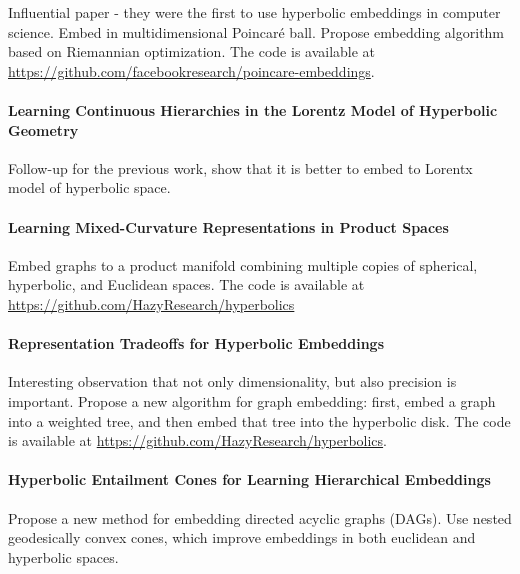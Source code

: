 \documentclass{article}
\begin{document}
Influential paper - they were the first to use hyperbolic embeddings in computer science.
Embed in multidimensional Poincar{\'e} ball. Propose embedding algorithm based on Riemannian optimization. The code is available at \url{https://github.com/facebookresearch/poincare-embeddings}.

\paragraph{Learning Continuous Hierarchies in the Lorentz Model of Hyperbolic Geometry~\cite{nickel2018learning}}

Follow-up for the previous work, show that it is better to embed to Lorentx model of hyperbolic space. 

\paragraph{Learning Mixed-Curvature Representations in Product Spaces~\cite{gu2019learning}}

Embed graphs to a product manifold combining multiple copies of spherical,
hyperbolic, and Euclidean spaces. The code is available at \url{https://github.com/HazyResearch/hyperbolics}

\paragraph{Representation Tradeoffs for Hyperbolic Embeddings~\cite{sala2018representation}}

Interesting observation that not only dimensionality, but also precision is important.
Propose a new algorithm for graph embedding: first, embed a graph into a weighted tree, and then embed that tree into the hyperbolic disk. The code is available at \url{https://github.com/HazyResearch/hyperbolics}.

\paragraph{Hyperbolic Entailment Cones for Learning Hierarchical Embeddings~\cite{ganea2018hyperbolic}}

Propose a new method for embedding directed acyclic graphs (DAGs). 
Use nested geodesically convex cones, which improve embeddings in both euclidean and hyperbolic spaces. 



\end{document}
